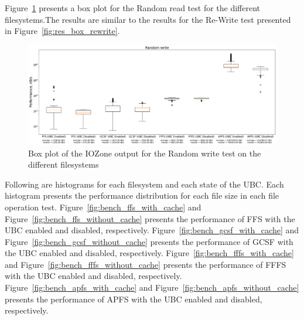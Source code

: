 \FloatBarrier

Figure~\ref{fig:res_box_rndwrite} presents a box plot for the Random read test for the different filesystems.The results are similar to the results for the \mbox{Re-Write} test presented in Figure~\ref{fig:res_box_rewrite}.

\begin{figure}[!ht]
	\label{fig:res_box_rndwrite}
	\begin{center}
		\includegraphics[width=1.0\textwidth]{figures.nosync/benchmarking/Random write-boxplot.pdf}
	\end{center}
	\caption{Box plot of the IOZone output for the Random write test on the different filesystems}
\end{figure}

\FloatBarrier

Following are histograms for each filesystem and each state of the \gls{UBC}. Each histogram presents the performance distribution for each file size in each file operation test. Figure~\ref{fig:bench_ffs_with_cache} and Figure~\ref{fig:bench_ffs_without_cache} presents the performance of \gls{FFS} with the \gls{UBC} enabled and disabled, respectively. Figure~\ref{fig:bench_gcsf_with_cache} and Figure~\ref{fig:bench_gcsf_without_cache} presents the performance of \gls{GCSF} with the \gls{UBC} enabled and disabled, respectively. Figure~\ref{fig:bench_fffs_with_cache} and Figure~\ref{fig:bench_fffs_without_cache} presents the performance of \gls{FFFS} with the \gls{UBC} enabled and disabled, respectively. Figure~\ref{fig:bench_apfs_with_cache} and Figure~\ref{fig:bench_apfs_without_cache} presents the performance of \gls{APFS} with the \gls{UBC} enabled and disabled, respectively.

